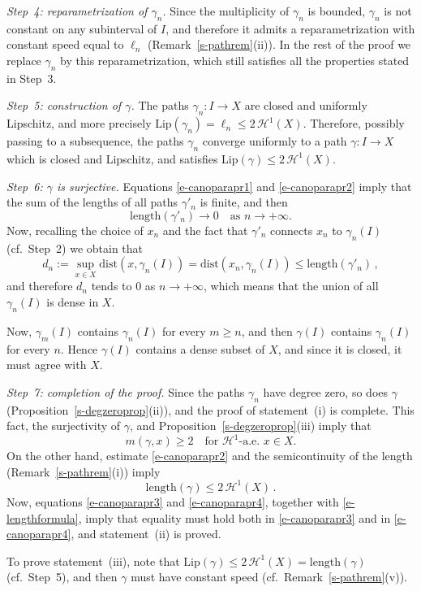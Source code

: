 \documentclass[11pt,reqno,a4paper,final]{amsart}
\makeatletter
\numberwithin{equation}{section}
\theoremstyle{mytheorem}
\theoremstyle{myremark}
\theoremstyle{myparagraph}
\renewenvironment{proof}[1][\proofname]{\par 
  \pushQED{\qed}%
  \normalfont \topsep10\p@\@plus6\p@\relax 
  \trivlist 
  \item[\hskip\labelsep 
    \bfseries 
    #1\@addpunct{.}]\ignorespaces 
}{%
  \popQED\endtrivlist\@endpefalse 
}
\providecommand{\proofname}{Proof}
\newcommand{\Haus}{\mathscr{H}}
\newcommand{\Len}{\mathrm{length}}
\newcommand{\dist}{\mathrm{dist}}
\newcommand{\Lip}{\mathrm{Lip}}
\makeatother
\begin{document}
\begin{proof}[Proof of Theorem~\ref{s-canopara}]
\medskip
\emph{Step~4: reparametrization of $\gamma_n$.}
Since the multiplicity of $\gamma_n$ is bounded, 
$\gamma_n$ is not constant on any subinterval of $I$, 
and therefore it admits a reparametrization 
with constant speed equal to $\ell_n$ (Remark~\ref{s-pathrem}(ii)).
In the rest of the proof we replace $\gamma_n$ 
by this reparametrization, which still satisfies 
all the properties stated in Step~3.

\medskip
\emph{Step~5: construction of $\gamma$.}
The paths $\gamma_n:I\to X$ are closed and uniformly 
Lipschitz, and more precisely $\Lip(\gamma_n)=\ell_n\le 2\,\Haus^1(X)$. 
Therefore, possibly passing to a subsequence, 
the paths $\gamma_n$ converge uniformly to a path $\gamma:I\to X$ 
which is closed and Lipschitz, and satisfies
$\Lip(\gamma) \le 2\,\Haus^1(X)$.

\medskip
\emph{Step~6: $\gamma$ is surjective.}
Equations \eqref{e-canoparapr1} and \eqref{e-canoparapr2} imply that
the sum of the lengths of all paths $\gamma'_n$ is finite, and then
\[
\Len(\gamma'_n) \to 0 
\quad\text{as $n\to +\infty$.}
\]
Now, recalling the choice of $x_n$ and the fact that 
$\gamma'_n$ connects $x_n$ to $\gamma_n(I)$ (cf.~Step~2) 
we obtain that
\[
d_n:=\sup_{x\in X} \dist(x,\gamma_n(I))
=\dist(x_n,\gamma_n(I)) 
\le \Len(\gamma'_n)
\, ,
\]
and therefore $d_n$ tends to $0$ as $n\to +\infty$,
which means that the union of all $\gamma_n(I)$ is dense in $X$.

Now, $\gamma_m(I)$ contains $\gamma_n(I)$ for every $m\ge n$, 
and then $\gamma(I)$ contains $\gamma_n(I)$ for every $n$.
Hence $\gamma(I)$ contains a dense subset of $X$, 
and since it is closed, it must agree with $X$.

\medskip
\emph{Step~7: completion of the proof.}
Since the paths $\gamma_n$ have degree zero, so does $\gamma$ 
(Proposition~\ref{s-degzeroprop}(ii)), and the proof of 
statement~(i) is complete. 
This fact, the surjectivity of $\gamma$, and
Proposition~\ref{s-degzeroprop}(iii) imply that 
%
\begin{equation}
\label{e-canoparapr3}
m(\gamma,x)\ge 2 
\quad\text{for $\Haus^1$-a.e.~$x\in X$.}
\end{equation}
%
On the other hand, estimate \eqref{e-canoparapr2} and the 
semicontinuity of the length (Remark~\ref{s-pathrem}(i)) imply
%
\begin{equation}
\label{e-canoparapr4}
\Len(\gamma)\le 2\,\Haus^1(X)
\, .
\end{equation}
%
Now, equations \eqref{e-canoparapr3} and \eqref{e-canoparapr4},
together with \eqref{e-lengthformula}, imply that equality must 
hold both in \eqref{e-canoparapr3} and in \eqref{e-canoparapr4}, 
and statement~(ii) is proved. 

To prove statement~(iii), note that 
$\Lip(\gamma) \le 2\,\Haus^1(X) = \Len(\gamma)$ (cf.~Step~5), 
and then $\gamma$ must have constant speed (cf.~Remark~\ref{s-pathrem}(v)).
\end{proof}
\end{document}
